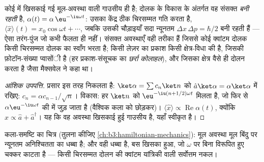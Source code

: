 \begin{proposition}[लेज़र चिरसम्मत क्यों हैं]\label{prop:b3:harmonic-oscillator:coherent-motion}
कोई   में खिसकाई गई मूल-अवस्था वाली गाउसीय ही
है; दोलक के विकास के अंतर्गत वह संसक्त \emph{बनी रहती} है,
$\alpha(t) = \alpha\,\eu^{-\iu\omega t}$: उसका केंद्र ठीक
चिरसम्मत गति करता है, $\langle\hat x\rangle(t) =
x_0\cos\omega t + \cdots$, जबकि उसकी चौड़ाइयाँ सदा न्यूनतम
$\Delta x\,\Delta p = \hbar/2$ बनी रहती हैं --- ऐसा तरंग-पुंज जो कभी
फैलता ही नहीं। संसक्त अवस्थाएँ वही तरीका हैं जिससे कोई क्वांटम दोलक
किसी चिरसम्मत दोलक का स्वाँग भरता है; किसी लेज़र का प्रकाश किसी
क्षेत्र-विधा की  है, जिसकी फ़ोटॉन-संख्या प्वासोंी है
(हर प्रकाश-संसूचक का \emph{छर्रा कोलाहल}), और जिसका क्षेत्र वैसे ही
दोलन करता है जैसा मैक्सवेल ने कहा था।
\end{proposition}

\begin{proof}[आंशिक उपपत्ति]
प्रसार इस तरह निकलता है: $\ket\alpha = \sum c_n\ket n$ को
$\hat a\ket\alpha = \alpha\ket\alpha$ में रखिए: $c_n = \alpha c_{n-1}/\sqrt
n$। विकास: हर $\ket n$ को $\eu^{-\iu(n + 1/2)\omega t}$ मिलता है,
जो फिर से $\alpha\eu^{-\iu\omega t}$ की  में जुड़ जाता है
(वैश्विक कला को छोड़कर)। $\langle\hat x\rangle \propto
\operatorname{Re}\alpha(t)$, क्योंकि $\hat x \propto \hat a +
\hat a^\dagger$। यह कि वह अवस्था खिसकाई हुई गाउसीय है,
यहाँ स्वीकृत है।
\end{proof}

\begin{omfigure}

{\small कला-समष्टि का चित्र (तुलना कीजिए
\cref{ch:b3:hamiltonian-mechanics}): मूल अवस्था मूल बिंदु पर न्यूनतम
अनिश्चितता का धब्बा है; और  वही धब्बा है, बस खिसका हुआ,
जो $\omega$ पर बिना विरूपित हुए चक्कर काटता है --- किसी चिरसम्मत दोलन
की क्वांटम यांत्रिकी वाली सर्वोत्तम नकल।}
\end{omfigure}

